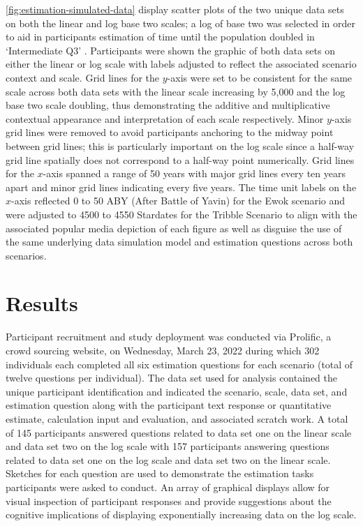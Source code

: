 \documentclass[print]{nuthesis}
\begin{document}
\cref{fig:estimation-simulated-data} display scatter plots of the two unique data sets on both the linear and log base two scales; a log of base two was selected in order to aid in participants estimation of time until the population doubled in `Intermediate Q3' .
Participants were shown the graphic of both data sets on either the linear or log scale with labels adjusted to reflect the associated scenario context and scale.
Grid lines for the \(y\)-axis were set to be consistent for the same scale across both data sets with the linear scale increasing by 5,000 and the log base two scale doubling, thus demonstrating the additive and multiplicative contextual appearance and interpretation of each scale respectively.
Minor \(y\)-axis grid lines were removed to avoid participants anchoring to the midway point between grid lines; this is particularly important on the log scale since a half-way grid line spatially does not correspond to a half-way point numerically.
Grid lines for the \(x\)-axis spanned a range of 50 years with major grid lines every ten years apart and minor grid lines indicating every five years.
The time unit labels on the \(x\)-axis reflected 0 to 50 ABY (After Battle of Yavin) for the Ewok scenario and were adjusted to 4500 to 4550 Stardates for the Tribble Scenario to align with the associated popular media depiction of each figure as well as disguise the use of the same underlying data simulation model and estimation questions across both scenarios.

\hypertarget{results-3}{%
\section{Results}\label{results-3}}

Participant recruitment and study deployment was conducted via Prolific, a crowd sourcing website, on Wednesday, March 23, 2022 during which 302 individuals each completed all six estimation questions for each scenario (total of twelve questions per individual).
The data set used for analysis contained the unique participant identification and indicated the scenario, scale, data set, and estimation question along with the participant text response or quantitative estimate, calculation input and evaluation, and associated scratch work.
A total of 145 participants answered questions related to data set one on the linear scale and data set two on the log scale with 157 participants answering questions related to data set one on the log scale and data set two on the linear scale.
Sketches for each question are used to demonstrate the estimation tasks participants were asked to conduct.
An array of graphical displays allow for visual inspection of participant responses and provide suggestions about the cognitive implications of displaying exponentially increasing data on the log scale.
\end{document}
